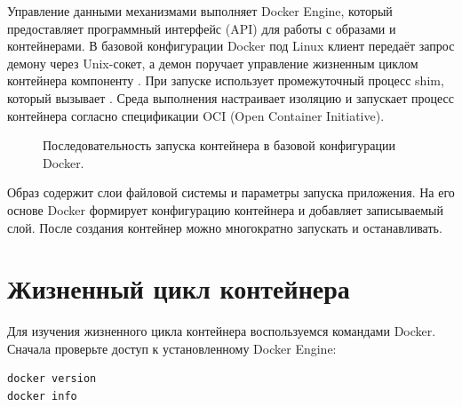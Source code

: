 Управление данными механизмами выполняет Docker Engine, который предоставляет программный интерфейс (API) для работы с образами и контейнерами. В базовой конфигурации Docker под Linux клиент  передаёт запрос демону  через Unix-сокет, а демон поручает управление жизненным циклом контейнера компоненту . При запуске  использует промежуточный процесс shim, который вызывает . Среда выполнения  настраивает изоляцию и запускает процесс контейнера согласно спецификации OCI (Open Container Initiative).

\begin{figure}[!htb]
  \centering
  \caption{Последовательность запуска контейнера в базовой конфигурации Docker.}
\end{figure}

Образ содержит слои файловой системы и параметры запуска приложения. На его основе Docker формирует конфигурацию контейнера и добавляет записываемый слой. После создания контейнер можно многократно запускать и останавливать.

\section{Жизненный цикл контейнера}

\par\addvspace{10pt}\noindent\begin{minipage}{\linewidth}
\setlength{\parindent}{0pt}\noindent\hspace*{1.25cm}Для изучения жизненного цикла контейнера воспользуемся командами Docker. Сначала проверьте доступ к установленному Docker Engine:\par\kern 10pt
\begin{verbatim}
docker version
docker info
\end{verbatim}
\end{minipage}\par\addvspace{10pt}

